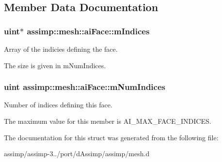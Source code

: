 \subsection{Member Data Documentation}
\hypertarget{structassimp_1_1mesh_1_1ai_face_ada4a5dca43ff829a1e7b8b855b652b04}{
\subsubsection[{m\+Indices}]{\setlength{\rightskip}{0pt plus 5cm}uint$\ast$ assimp\+::mesh\+::ai\+Face\+::m\+Indices}}\label{structassimp_1_1mesh_1_1ai_face_ada4a5dca43ff829a1e7b8b855b652b04}
Array of the indicies defining the face.

The size is given in {\ttfamily m\+Num\+Indices}. \hypertarget{structassimp_1_1mesh_1_1ai_face_a8968f7452844b692c5fbd79764ec41c8}{
\subsubsection[{m\+Num\+Indices}]{\setlength{\rightskip}{0pt plus 5cm}uint assimp\+::mesh\+::ai\+Face\+::m\+Num\+Indices}}\label{structassimp_1_1mesh_1_1ai_face_a8968f7452844b692c5fbd79764ec41c8}
Number of indices defining this face.

The maximum value for this member is {\ttfamily A\+I\+\_\+\+M\+A\+X\+\_\+\+F\+A\+C\+E\+\_\+\+I\+N\+D\+I\+C\+E\+S}. 

The documentation for this struct was generated from the following file\+:\begin{DoxyCompactItemize}
\item 
assimp/assimp-\/3../port/d\+Assimp/assimp/mesh.\+d\end{DoxyCompactItemize}
